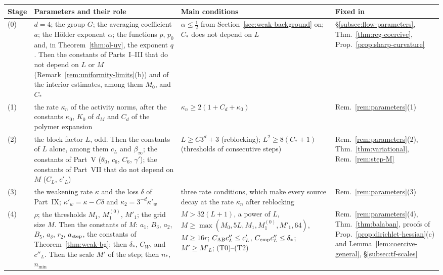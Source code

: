 \begin{table}[tbp]
\centering\small
\renewcommand{\arraystretch}{1.15}
\begin{tabular}{|p{}|p{}|p{}|p{}|}
\hline
Stage & Parameters and their role & Main conditions & Fixed in\tabularnewline
\hline
(0) & \raggedright $d=4$; the group $G$; the averaging coefficient $a$; the H\"older exponent $\alpha$; the functions $p$, $p_0$ and, in Theorem~\ref{thm:ol-uv}, the exponent $q$. Then the constants of Parts~I--III that do not depend on $L$ or $M$ (Remark~\ref{rem:uniformity-limits}(b)) and of the interior estimates, among them $M_0$, and $C_*$ & \raggedright $\alpha\le\frac12$ from Section~\ref{sec:weak-background} on; $C_*$ does not depend on $L$ & \raggedright \S\ref{subsec:flow-parameters}, Thm.~\ref{thm:reg-coercive}, Prop.~\ref{prop:sharp-curvature}\tabularnewline
(1) & \raggedright the rate $\kappa_n$ of the activity norms, after the constants $\kappa_0$, $K_0$ of $d_M$ and $C_d$ of the polymer expansion & \raggedright $\kappa_n\ge2(1+C_d+\kappa_0)$ & \raggedright Rem.~\ref{rem:parameters}(1)\tabularnewline
(2) & \raggedright the block factor $L$, odd. Then the constants of $L$ alone, among them $c_L$ and $\beta_\infty$; the constants of Part~V ($\theta_0$, $c_6$, $C_6$, $\gamma'$); the constants of Part~VII that do not depend on $M$ ($C_L$, $c'_L$) & \raggedright $L\ge C3^d+3$ (reblocking); $L^2\ge8(C_*+1)$ (thresholds of consecutive steps) & \raggedright Rem.~\ref{rem:parameters}(2), Thm.~\ref{thm:variational}, Rem.~\ref{rem:step-M}\tabularnewline
(3) & \raggedright the weakening rate $\kappa$ and the loss $\delta$ of Part~IX; $\kappa'_w=\kappa-C\delta$ and $\kappa_2=3^{-d}\kappa'_w$ & \raggedright three rate conditions, which make every source decay at the rate $\kappa_n$ after reblocking & \raggedright Rem.~\ref{rem:parameters}(3)\tabularnewline
(4) & \raggedright $\rho$; the thresholds $M_1$, $M_1^{(0)}$, $M'_1$; the grid size $M$. Then the constants of $M$: $a_1$, $B_3$, $a_2$, $B_5$, $a_\delta$, $r_2$, $a_{\rm step}$, the constants of Theorem~\ref{thm:weak-bg}; then $\delta_*$, $C_W$, and $c''_L$. Then the scale $M'$ of the step; then $n_*$, $n_{\min}$ & \raggedright $M>32(L+1)$, a power of $L$, $M\ge\max(M_0,5L,M_1,M_1^{(0)},M'_1,64)$, $M\ge16r$; $C_{\rm AB}c''_L\le c'_L$, $C_{\rm cmp}c''_L\le\delta_*$; $M'\ge M'_L$; (T0)--(T2) & \raggedright Rem.~\ref{rem:parameters}(4), Thm.~\ref{thm:balaban}, proofs of Prop.~\ref{prop:dirichlet-hessian}(c) and Lemma~\ref{lem:coercive-general}, \S\ref{subsec:tf-scales}\tabularnewline

\end{tabular}
\end{table}
